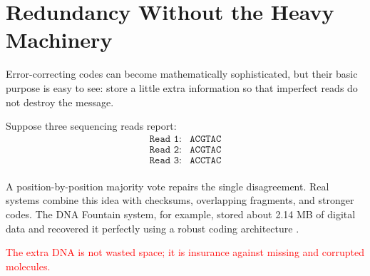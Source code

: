 \documentclass{article}
\begin{document}
\section{Redundancy Without the Heavy Machinery}
Error-correcting codes can become mathematically sophisticated, but their basic purpose is easy to see:
store a little extra information so that imperfect reads do not destroy the message.

Suppose three sequencing reads report:
\begin{align*}
    \texttt{Read 1:} & \texttt{ACGTAC} \\
    \texttt{Read 2:} & \texttt{ACGTAC} \\
    \texttt{Read 3:} & \texttt{ACCTAC} \\
\end{align*}

A position-by-position majority vote repairs the single disagreement. Real systems combine this idea
with checksums, overlapping fragments, and stronger codes. The DNA Fountain system, for example,
stored about 2.14 MB of digital data and recovered it perfectly using a robust coding architecture \cite{organick2018}.

\textcolor{red}{The extra DNA is not wasted space; it is insurance against missing and corrupted molecules.}



\printbibliography
\end{document}
